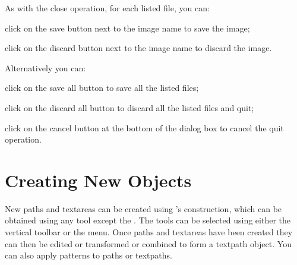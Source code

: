 As with the close operation, for each listed file, you can:
\begin{deflist}

\begin{itemdesc}
click on the save button next to the image name to save the image;
\end{itemdesc}


\begin{itemdesc}
click on the discard button next to the image name to discard the
image.
\end{itemdesc}

\end{deflist}

Alternatively you can:
\begin{deflist}

\begin{itemdesc}
click on the save all button to save all the listed files;
\end{itemdesc}


\begin{itemdesc}
click on the discard all button to discard all the listed files and
quit;
\end{itemdesc}


\begin{itemdesc}
click on the cancel button at the bottom of the dialog box to cancel
the quit operation.
\end{itemdesc}

\end{deflist}

\chapter{Creating New Objects}\label{sec:newobjects}


New \glspl{path} and \glspl{textarea} can be created using
\FlowframTk's \gls{construction}, which can be obtained using any tool
except the . The tools can be selected using either the
vertical \gls{toolbar} or the  menu. Once \glspl{path}
and \glspl{textarea} have been created they can then be edited or
transformed or combined to form a \gls{textpath} object. You can
also apply patterns to \glspl{path} or \glspl{textpath}.

